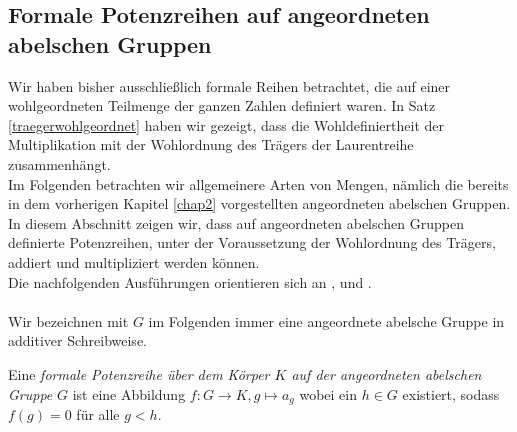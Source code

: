 \subsection{Formale Potenzreihen auf angeordneten abelschen Gruppen}
%
% 
%
%
%
%
Wir haben bisher ausschließlich formale Reihen betrachtet, die auf einer wohlgeordneten Teilmenge der ganzen Zahlen definiert waren. In Satz \ref{traegerwohlgeordnet} haben wir gezeigt, dass die Wohldefiniertheit der Multiplikation mit der Wohlordnung des Trägers der Laurentreihe zusammenhängt. \\
Im Folgenden betrachten wir allgemeinere Arten von Mengen, nämlich die bereits in dem vorherigen Kapitel \ref{chap2} vorgestellten angeordneten abelschen Gruppen. In diesem Abschnitt zeigen wir, dass auf angeordneten abelschen Gruppen definierte Potenzreihen, unter der Voraussetzung der Wohlordnung des Trägers, addiert und multipliziert werden können.\\  
  Die nachfolgenden Ausführungen orientieren sich an \cite[S. 194 - 199]{fuchs66}, \cite[S. 601 - 655]{hahn07} und \cite[S. 49 - 64]{priesscrampe83}.\\\\
Wir bezeichnen mit $G$ im Folgenden immer eine angeordnete abelsche Gruppe in additiver Schreibweise.
%
%
%
%
%
%
\begin{defn}\label{funktionsDefinitionFormalePotenzreihe}
Eine \textit{formale Potenzreihe über dem Körper $K$ auf der angeordneten abelschen Gruppe} $G$ ist eine Abbildung $f\colon G \to K, g \mapsto a_g$ wobei ein $h \in G$ existiert, sodass $f(g) = 0$ für alle $g < h$.
\end{defn}
%
%
%





